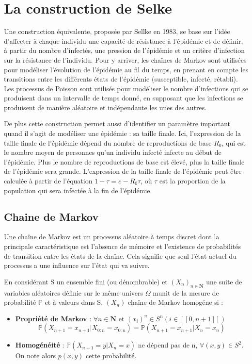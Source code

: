 \section{La construction de Selke}

Une construction équivalente, proposée par Sellke en 1983, se base sur l’idée d’affecter à chaque individu une capacité de résistance à l’épidémie et de définir, à partir du nombre d’infectés, une pression de l’épidémie et un critère d’infection sur la résistance de l’individu. Pour y arriver, les chaînes de Markov sont utilisées pour modéliser l’évolution de l’épidémie au fil du temps, en prenant en compte les transitions entre les différents états de l’épidémie (susceptible, infecté, rétabli). Les processus de Poisson sont utilisés pour modéliser le nombre d’infections qui se produisent dans un intervalle de temps donné, en supposant que les infections se produisent de manière aléatoire et indépendante les unes des autres.

De plus cette construction permet aussi d’identifier un paramètre important quand il s’agit de modéliser une épidémie : sa taille finale. Ici, l’expression de la taille finale de l’épidémie dépend du nombre de reproductions de base $R_0$, qui est le nombre moyen de personnes qu’un individu infecté infecte au début de l’épidémie. Plus le nombre de reproductions de base est élevé, plus la taille finale de l’épidémie sera grande. L’expression de la taille finale de l’épidémie peut être calculée à partir de l’équation $1 - \tau = e - R_0\tau$, où $\tau$ est la proportion de la population qui sera infectée à la fin de l’épidémie.


\subsection{Chaine de Markov}

Une chaîne de Markov est un processus aléatoire à temps discret dont la principale caractéristique est l’absence de mémoire et l’existence de probabilités de transition entre les états de la chaîne. Cela signifie que seul l’état actuel du processus a une influence sur l’état qui va suivre.

En considérant S un ensemble fini (ou dénombrable) et $(X_n)_{n \in \boldsymbol{N}}$ une suite de variables aléatoires définie sur le même univers $\Omega$ munit de la mesure de probabilité $\mathbb{P}$ et à valeurs dans S. $(X_n)$ chaîne de Markov homogéne si :

\begin{itemize}
    \item \textbf{Propriété de Markov} : $\forall n \in \boldsymbol{N}$ et $(x_i)^n \in S^n (i \in [[0, n+1]])$ \\
$$ \mathbb{P}(X_{n+1} = x_{n+1} | X_{0:n} = x_{0:n}) = \mathbb{P}(X_{n+1} = x_{n+1} | X_n = x_n) $$
    \item \textbf{Homogénéité} : $\mathbb{P}(X_{n+1} = y | X_n = x)$ ne dépend pas de n, $\forall (x, y) \in S^2$. On note alors $p(x, y)$ cette probabilité.
\end{itemize}

